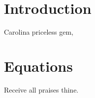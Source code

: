 

\section{Introduction} \label{sec:Intro}


Carolina priceless gem,

\section{Equations} \label{sec:Equations}

Receive all praises thine.